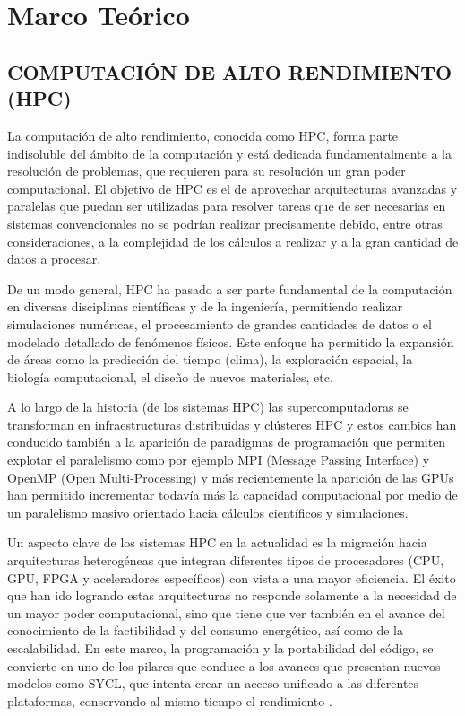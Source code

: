 \section{Marco Teórico}

\subsection{COMPUTACIÓN DE ALTO RENDIMIENTO (HPC)}

La computación de alto rendimiento, conocida como HPC, forma parte indisoluble del ámbito de la computación y está dedicada fundamentalmente a la resolución de problemas, que requieren para su resolución un gran poder computacional. El objetivo de HPC es el de aprovechar arquitecturas avanzadas y paralelas que puedan ser utilizadas para resolver tareas que de ser necesarias en sistemas convencionales no se podrían realizar precisamente debido, entre otras consideraciones, a la complejidad de los cálculos a realizar y a la gran cantidad de datos a procesar. \cite{eijkhout_art_2022}


De un modo general, HPC ha pasado a ser parte fundamental de la computación en diversas disciplinas científicas y de la ingeniería, permitiendo realizar simulaciones numéricas, el procesamiento de grandes cantidades de datos o el modelado detallado de fenómenos físicos. Este enfoque ha permitido la expansión de áreas como la predicción del tiempo (clima), la exploración espacial, la biología computacional, el diseño de nuevos materiales, etc.


A lo largo de la historia (de los sistemas HPC) las supercomputadoras se transforman en infraestructuras distribuidas y clústeres HPC y estos cambios han conducido también a la aparición de paradigmas de programación que permiten explotar el paralelismo como por ejemplo MPI (Message Passing Interface) y OpenMP (Open Multi-Processing) y más recientemente la aparición de las GPUs han permitido incrementar todavía más la capacidad computacional por medio de un paralelismo masivo orientado hacia cálculos científicos y simulaciones.\cite{eijkhout_art_2022}


Un aspecto clave de los sistemas HPC en la actualidad es la migración hacia arquitecturas heterogéneas que integran diferentes tipos de procesadores (CPU, GPU, FPGA y aceleradores específicos) con vista a una mayor eficiencia. El éxito que han ido logrando estas arquitecturas no responde solamente a la necesidad de un mayor poder computacional, sino que tiene que ver también en el avance del conocimiento de la factibilidad y del consumo energético, así como de la escalabilidad. En este marco, la programación y la portabilidad del código, se convierte en uno de los pilares que conduce a los avances que presentan nuevos modelos como SYCL, que intenta crear un acceso unificado a las diferentes plataformas, conservando al mismo tiempo el rendimiento \cite{reinders_data_2021} .


